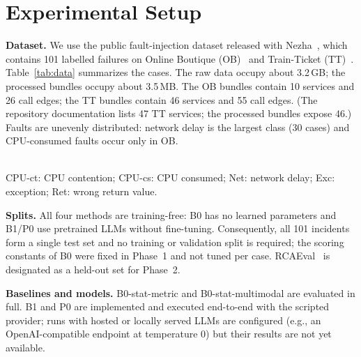 \documentclass[conference]{IEEEtran}
\begin{document}
\section{Experimental Setup}\label{sec:setup}

\textbf{Dataset.} We use the public fault-injection dataset released with Nezha~\cite{yu2023nezha}, which contains 101 labelled failures on Online Boutique (OB)~\cite{google2024onlineboutique} and Train-Ticket (TT)~\cite{zhou2021trainticket}. Table~\ref{tab:data} summarizes the cases. The raw data occupy about 3.2\,GB; the processed bundles occupy about 3.5\,MB. The OB bundles contain 10 services and 26 call edges; the TT bundles contain 46 services and 55 call edges. (The repository documentation lists 47 TT services; the processed bundles expose 46.) Faults are unevenly distributed: network delay is the largest class (30 cases) and CPU-consumed faults occur only in OB.

\begin{table}[t]
\centering
\caption{Evaluation cases by system and fault type.}
\label{tab:data}
\footnotesize
{}\\[2pt]
{\scriptsize CPU-ct: CPU contention; CPU-cs: CPU consumed; Net: network delay; Exc: exception; Ret: wrong return value.}
\end{table}

\textbf{Splits.} All four methods are training-free: B0 has no learned parameters and B1/P0 use pretrained LLMs without fine-tuning. Consequently, all 101 incidents form a single test set and no training or validation split is required; the scoring constants of B0 were fixed in Phase~1 and not tuned per case. RCAEval~\cite{pham2025rcaeval} is designated as a held-out set for Phase~2.

\textbf{Baselines and models.} B0-stat-metric and B0-stat-multimodal are evaluated in full. B1 and P0 are implemented and executed end-to-end with the scripted provider; runs with hosted or locally served LLMs are configured (e.g., an OpenAI-compatible endpoint at temperature 0) but their results are not yet available.
\end{document}
